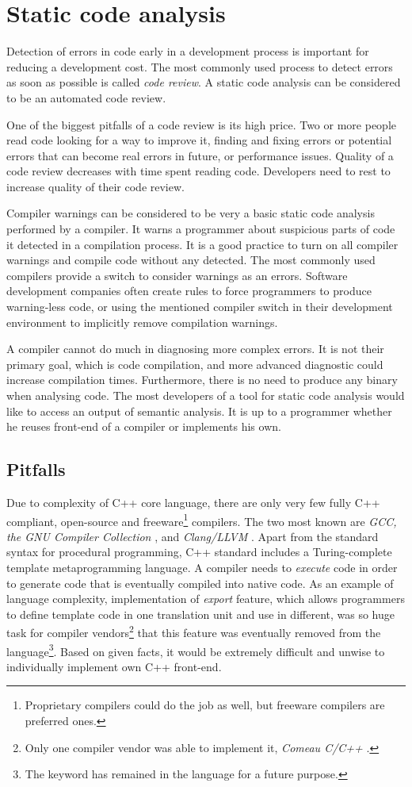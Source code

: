 \chapter{Static code analysis}
Detection of errors in code early in a development process is important for reducing a development cost. The most commonly used process to detect errors as soon as possible is called \emph{code review}. A static code analysis can be considered to be an automated code review.

One of the biggest pitfalls of a code review is its high price. Two or more people read code looking for a way to improve it, finding and fixing errors or potential errors that can become real errors in future, or performance issues. Quality of a code review decreases with time spent reading code. Developers need to rest to increase quality of their code review.

Compiler warnings can be considered to be very a basic static code analysis performed by a compiler. It warns a programmer about suspicious parts of code it detected in a compilation process. It is a good practice to turn on all compiler warnings and compile code without any detected. The most commonly used compilers provide a switch to consider warnings as an errors. Software development companies often create rules to force programmers to produce warning-less code, or using the mentioned compiler switch in their development environment to implicitly remove compilation warnings.

A compiler cannot do much in diagnosing more complex errors. It is not their primary goal, which is code compilation, and more advanced diagnostic could increase compilation times. Furthermore, there is no need to produce any binary when analysing code. The most developers of a tool for static code analysis would like to access an output of semantic analysis. It is up to a programmer whether he reuses front-end of a compiler or implements his own.

\section{Pitfalls}
Due to complexity of C++ core language, there are only very few fully C++ compliant, open-source and freeware\footnote{Proprietary compilers could do the job as well, but freeware compilers are preferred ones.} compilers. The two most known are \emph{GCC, the GNU Compiler Collection} \cite{gcc}, and \emph{Clang/LLVM} \cite{clang}. Apart from the standard syntax for procedural programming, C++ standard includes a Turing-complete template metaprogramming language. A compiler needs to \textit{execute} code in order to generate code that is eventually compiled into native code. As an example of language complexity, implementation of \emph{export} feature, which allows programmers to define template code in one translation unit and use in different, was so huge task for compiler vendors\footnote{Only one compiler vendor was able to implement it, \emph{Comeau C/C++} \cite{comeau}.} that this feature was eventually removed from the language\footnote{The keyword has remained in the language for a future purpose.}. Based on given facts, it would be extremely difficult and unwise to individually implement own C++ front-end.

